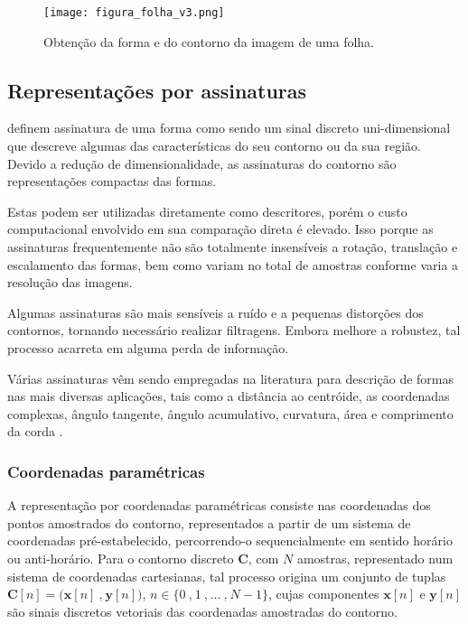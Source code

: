     

\begin{figure} 
\caption{\label{fig:folha_contorno1} Obtenção da forma e do contorno da imagem de uma folha.}
\texttt{[image: figura\_folha\_v3.png]}
\end{figure}

\subsection{\label{sec:Assinatura}Representações por assinaturas
}

 definem assinatura de uma forma como sendo um sinal discreto uni-dimensional que descreve algumas das características do seu contorno ou da sua região. Devido a redução de dimensionalidade, as assinaturas do contorno são representações compactas das formas. 

Estas podem ser utilizadas diretamente como descritores, porém o custo computacional envolvido em sua comparação direta é elevado. Isso porque as assinaturas frequentemente não são totalmente insensíveis a rotação, translação e escalamento das formas, bem como variam no total de amostras conforme varia a resolução das imagens. 

Algumas assinaturas são mais sensíveis a ruído e a pequenas distorções dos contornos, tornando necessário realizar filtragens. Embora melhore a robustez, tal processo acarreta em alguma perda de informação.

Várias assinaturas vêm sendo empregadas na literatura para descrição de formas nas mais diversas aplicações, tais como a distância ao centróide, as coordenadas complexas, ângulo tangente, ângulo acumulativo, curvatura, área e comprimento da corda \cite{Zhang:2004}.

\subsubsection*{\label{sec:Rep_par}Coordenadas paramétricas}
A representação por coordenadas paramétricas consiste nas coordenadas dos pontos amostrados do contorno, representados a partir de um sistema de coordenadas pré-estabelecido, percorrendo-o sequencialmente em sentido horário ou anti-horário. Para o contorno discreto $\mathbf{C}$, com $N$ amostras, representado num sistema de coordenadas cartesianas, tal processo origina um conjunto de tuplas $\mathbf{C}[n] = \big(\mathbf{x}[n]\:\text{,}\:\mathbf{y}[n]\big)$, $n \in {\{0\:\text{,}\:1\:\text{,}\:\dotsc\:\text{,}\:N-1\}}$, cujas componentes $\mathbf{x}[n]$ e $\mathbf{y}[n]$ são sinais discretos vetoriais das coordenadas amostradas do contorno.

